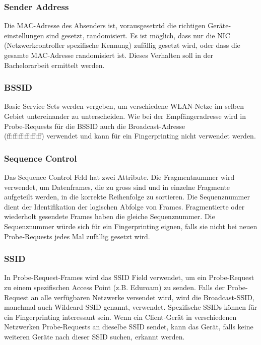 \subsubsection*{Sender Address}
Die MAC-Adresse des Absenders ist, vorausgesetztd die richtigen Geräte-einstellungen
sind gesetzt, randomisiert. Es ist möglich, dass nur die NIC (Netzwerkcontroller 
spezifische Kennung) zufällig gesetzt wird, oder dass die gesamte 
MAC-Adresse randomisiert ist. Dieses Verhalten soll in der Bachelorarbeit 
ermittelt werden.

\clearpage

\subsubsection*{BSSID}
Basic Service Sets werden vergeben, um verschiedene WLAN-Netze im selben 
Gebiet untereinander zu unterscheiden.
Wie bei der Empfängeradresse wird in Probe-Requests für die BSSID auch die 
Broadcast-Adresse \\ (ff:ff:ff:ff:ff:ff) verwendet und kann für ein Fingerprinting nicht verwendet 
werden.

\subsubsection*{Sequence Control}
Das Sequence Control Feld hat zwei Attribute. 
Die Fragmentnummer wird verwendet, um Datenframes, die zu gross sind und in 
einzelne Fragmente aufgeteilt werden, in die korrekte Reihenfolge zu sortieren.
Die Sequenznummer dient der Identifikation der logischen Abfolge von Frames.
Fragmentierte oder wiederholt gesendete Frames haben die gleiche Sequenznummer. 
Die Sequenznummer würde sich für ein Fingerprinting eignen, falls sie nicht
bei neuen Probe-Requests jedes Mal zufällig gesetzt wird. 

\subsubsection*{SSID}
In Probe-Request-Frames wird das SSID Field verwendet, um ein Probe-Request zu einem
spezifischen Access Point (z.B. Eduroam) zu senden. 
Falls der Probe-Request an alle verfügbaren Netzwerke versendet wird, wird die
Broadcast-SSID, manchmal auch Wildcard-SSID genannt, verwendet.
Spezifische SSIDs können für ein Fingerprinting interessant sein.
Wenn ein Client-Gerät in verschiedenen Netzwerken Probe-Requests an dieselbe SSID
sendet, kann das Gerät, falls keine weiteren Geräte nach dieser SSID suchen,
erkannt werden. 

